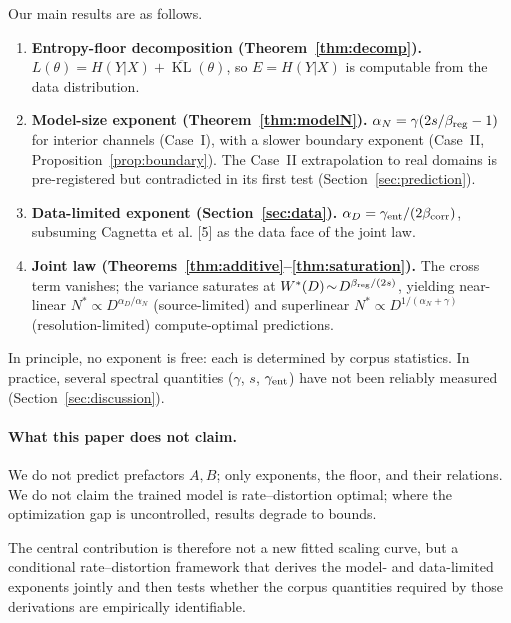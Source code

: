 \documentclass[12pt]{article}
\newcommand{\KL}{\operatorname{KL}}
\theoremstyle{remark}
\begin{document}
Our main results are as follows.
\begin{enumerate}[label=\textbf{(\arabic*)}]
\item \textbf{Entropy-floor decomposition (Theorem~\ref{thm:decomp}).}
  $L(\theta) = H(Y|X) + \overline{\KL}(\theta)$,
  so $E=H(Y|X)$ is computable from the data distribution.

\item \textbf{Model-size exponent (Theorem~\ref{thm:modelN}).}
  $\alpha_N = \gamma(2s/\beta_{\rm reg}-1)$ for interior channels (Case~I),
  with a slower boundary exponent (Case~II, Proposition~\ref{prop:boundary}).
  The Case~II extrapolation to real domains is pre-registered but contradicted
  in its first test (Section~\ref{sec:prediction}).

\item \textbf{Data-limited exponent (Section~\ref{sec:data}).}
  $\alpha_D = \gamma_{\rm ent}/(2\beta_{\rm corr})$, subsuming
  Cagnetta et al. [5] as the data face of the joint law.

\item \textbf{Joint law (Theorems~\ref{thm:additive}--\ref{thm:saturation}).}
  The cross term vanishes; the variance saturates at
  $W^*(D)\!\sim\!D^{\beta_{\rm reg}/(2s)}$, yielding near-linear
  $N^*\!\propto\!D^{\alpha_D/\alpha_N}$ (source-limited) and superlinear
  $N^*\!\propto\!D^{1/(\alpha_N+\gamma)}$ (resolution-limited)
  compute-optimal predictions.
\end{enumerate}

In principle, no exponent is free: each is determined by corpus statistics. In
practice, several spectral quantities ($\gamma$, $s$, $\gamma_{\rm ent}$) have
not been reliably measured (Section~\ref{sec:discussion}).

\paragraph{What this paper does not claim.}
We do not predict prefactors $A,B$; only exponents, the floor, and their
relations.  We do not claim the trained model is rate--distortion optimal; where
the optimization gap is uncontrolled, results degrade to bounds.

The central contribution is therefore not a new fitted scaling curve, but a
conditional rate--distortion framework that derives the model- and data-limited
exponents jointly and then tests whether the corpus quantities required by those
derivations are empirically identifiable.
\end{document}
